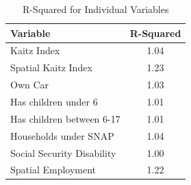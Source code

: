 \documentclass[12pt]{article}
\begin{document}
\begin{table}[H]
	\centering
	\begin{tabular}{lc}
		\toprule
		\textbf{Variable}          & \textbf{R-Squared} \\
		\midrule
		Kaitz Index                & 1.04               \\
		Spatial Kaitz Index        & 1.23               \\
		Own Car                    & 1.03               \\
		Has children under 6       & 1.01               \\
		Has children between 6-17  & 1.01               \\
		Households under SNAP      & 1.04               \\
		Social Security Disability & 1.00               \\
		Spatial Employment         & 1.22               \\
		\bottomrule
	\end{tabular}
	\caption{R-Squared for Individual Variables}
\end{table}
\end{document}
